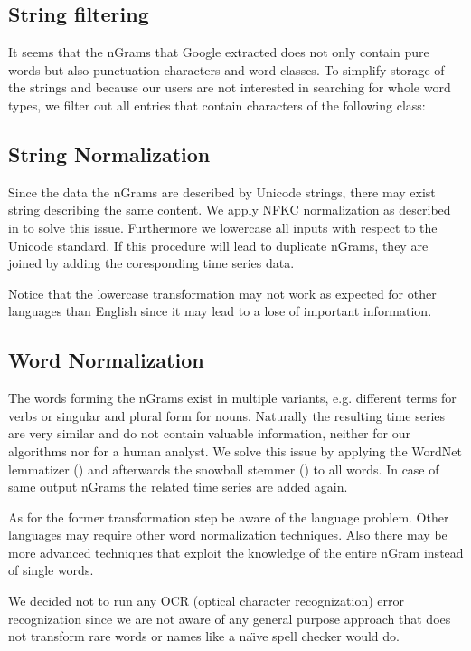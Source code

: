 \subsection{String filtering}
\label{ssec:baseline:data:filter}
It seems that the nGrams that Google extracted does not only contain pure words but also punctuation characters and word classes. To simplify storage of the strings and because our users are not interested in searching for whole word types, we filter out all entries that contain characters of the following class:

\code{\[_.,!'0-9\]}

\subsection{String Normalization}
\label{ssec:baseline:data:snorm}
Since the data the nGrams are described by Unicode strings, there may exist string describing the same content. We apply NFKC normalization as described in \cite{unicode8annex15} to solve this issue. Furthermore we lowercase all inputs with respect to the Unicode standard. If this procedure will lead to duplicate nGrams, they are joined by adding the coresponding time series data.

Notice that the lowercase transformation may not work as expected for other languages than English since it may lead to a lose of important information.


\subsection{Word Normalization}
\label{ssec:baseline:data:wnorm}
The words forming the nGrams exist in multiple variants, e.g. different terms for verbs or singular and plural form for nouns. Naturally the resulting time series are very similar and do not contain valuable information, neither for our algorithms nor for a human analyst. We solve this issue by applying the WordNet lemmatizer (\cite{wordnet}) and afterwards the snowball stemmer (\cite{porter2}) to all words. In case of same output nGrams the related time series are added again.

As for the former transformation step be aware of the language problem. Other languages may require other word normalization techniques. Also there may be more advanced techniques that exploit the knowledge of the entire nGram instead of single words.

We decided not to run any OCR (optical character recognization) error recognization since we are not aware of any general purpose approach that does not transform rare words or names like a na\"{\i}ve spell checker would do.


